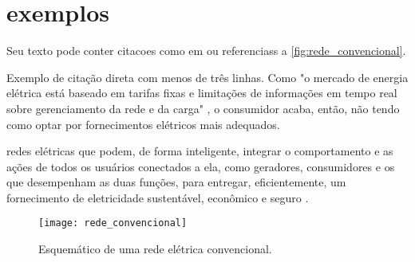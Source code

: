 \chapter[Exemplos]{exemplos}
\label{ch:exemplos}

Seu texto pode conter citacoes como em \cite{Legislativa} ou referenciass a \autoref{fig:rede_convencional}.

Exemplo de citação direta com menos de três linhas. Como "o mercado de energia elétrica está baseado em tarifas fixas e limitações de informações em tempo real sobre gerenciamento da rede e da carga" \cite[p. 15]{cgee}, o consumidor acaba, então, não tendo como optar por fornecimentos elétricos mais adequados.

\begin{citacao}[brazil]
[...] redes elétricas que podem, de forma inteligente, integrar o comportamento e as ações de todos os usuários conectados a ela, como geradores, consumidores e os que desempenham as duas funções, para entregar, eficientemente, um fornecimento de eletricidade sustentável, econômico e seguro \cite[p. 51, tradução livre]{yu2011new}.
\end{citacao}

\begin{figure}[h!]
	\texttt{[image: rede\_convencional]}
	\centering
	\caption[Esquemático de uma rede elétrica convencional.]{Esquemático de uma rede elétrica convencional.}
	\label{fig:rede_convencional}
\end{figure}
\FloatBarrier

